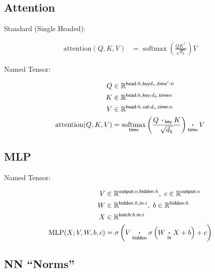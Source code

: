 \documentclass{article}
\DeclareMathOperator*{\softmax}{softmax}
\newcommand{\reals}[0]{\mathbb{R}}
\newcommand{\nfun}[2]{\underset{\name{#1}}{#2}}
\newcommand{\name}[1]{\mathsf{#1}}
\newcommand{\ndot}[1]{\mathbin{\mathop{\thinspace\boldsymbol\cdot\thinspace}\displaylimits_{\name{#1}}}}
\begin{document}
\subsection*{Attention}

Standard (Single Headed):

\begin{align*} 
\text{attention}(Q, K, V) &=  \softmax \left( \frac{Q K^\top }{\sqrt{d_k}} \right)  V 
\end{align*}


Named Tensor: 

\begin{align*} 
Q &\in \reals^{\name{head}:h, \name{key}{d_v},\name{time'}:n}\\
K &\in \reals^{\name{head}:h,\name{key}:d_k, \name{time}{n}}\\
V &\in \reals^{\name{head}:h, \name{val}:d_v, \name{time}:n}\\
\text{attention}(Q, K, V) &=  \nfun{time}{\softmax} \left( \frac{Q \ndot{key} K }{\sqrt{d_k}} \right) \ndot{time} V 
\end{align*}



\subsection*{MLP}


Named Tensor:

\begin{align*} 
V &\in \reals^{\name{output}:o, \name{hidden}:h},\ c\in \reals^{\name{output}:o} \\
W &\in \reals^{{\name{hidden}:h, \name{in}:i}}, \ b \in \reals^{\name{hidden}:h} \\
X &\in \reals^{{\name{batch}:b, \name{in}:i}} \\
\text{MLP}(X; V, W,b, c) &= \sigma \left( V \ndot{hidden} \sigma \left( W \ndot{in} X + b \right) + c \right)  
\end{align*}

\subsection*{NN ``Norms''}
\end{document}
